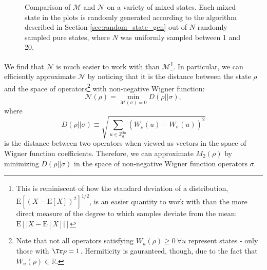 \documentclass{article}
\begin{document}
\begin{figure}[H]
\centering
{}\hspace{1.5em} 
\caption{Comparison of $\mathcal M$ and $\mathcal N$ on a variety of mixed states. Each mixed state in the plots is randomly generated according to the algorithm described in Section \ref{sec:random_state_gen} out of $N$ randomly sampled pure states, where $N$ was uniformly sampled between 1 and 20.}
\end{figure}

We find that $\mathcal N$ is much easier to work with than $\mathcal M$\footnote{This is reminiscent of how the standard deviation of a distribution, $\mathrm{E}[(X-\mathrm{E}[X])^2]^{1/2}$, is an easier quantity to work with than the more direct measure of the degree to which samples deviate from the mean: $\mathrm{E}[|X-\mathrm{E}[X]|]$}. In particular, we can efficiently approximate $\mathcal N$ by noticing that it is the distance between the state $\rho$ and the space of operators\footnote{Note that not all operators satisfying $W_u(\rho)\geq 0\ \forall u$ represent states - only those with $\Tr\rho=1$. Hermiticity is gauranteed, though, due to the fact that $W_u(\rho)\in \mathbb R$.} with non-negative Wigner function:
\begin{equation}\mathcal N(\rho)=\underset{\mathcal M(\sigma)=0}{\min}D(\rho||\sigma),\end{equation}
where
\begin{equation}D(\rho||\sigma)\equiv \sqrt{\sum_{u\in \mathbb Z_d^{2n}} \left(W_{\rho}(u)-W_{\sigma}(u)\right)^2}\end{equation}
is the distance between two operators when viewed as vectors in the space of Wigner function coefficients. Therefore, we can approximate $M_2(\rho)$ by minimizing $D(\rho||\sigma)$ in the space of non-negative Wigner function operators $\sigma$. 
\end{document}
